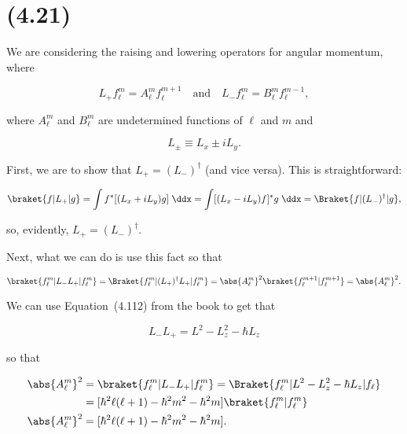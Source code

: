 \section{(4.21)}

We are considering the raising and lowering operators for angular momentum, where

\begin{equation}
    L_+ f_{\ell}^m = A_{\ell}^m f_{\ell}^{m+1} \quad\mathrm{and}\quad L_- f_{\ell}^m = B_{\ell}^m f_{\ell}^{m-1},
\end{equation}

where $A_{\ell}^m$ and $B_{\ell}^m$ are undetermined functions of $\ell$ and $m$ and 

\begin{equation}
    L_{\pm} \equiv L_x \pm iL_y.
\end{equation}

First, we are to show that $L_+ = (L_-)^{\dagger}$ (and vice versa). This is straightforward:

\begin{equation}
    \braket{f | L_+ | g} = \int f^* [(L_x + iL_y)g] \;\ddx = \int [(L_x - iL_y)f]^* g \;\ddx = \Braket{f | (L_-)^{\dagger} | g},
\end{equation}

so, evidently, $L_+ = (L_-)^{\dagger}$.

Next, what we can do is use this fact so that

\begin{equation}
    \braket{f_{\ell}^m | L_-L_+ | f_{\ell}^m} = \Braket{f_{\ell}^m | (L_+)^{\dagger}L_+ | f_{\ell}^m} = \abs{A_{\ell}^m}^2 \braket{f_{\ell}^{m+1} | f_{\ell}^{m+1}} = \abs{A_{\ell}^m}^2.
\end{equation}

We can use Equation~(4.112) from the book to get that

\begin{equation}
    L_-L_+ = L^2 - L_z^2 - \hbar L_z
\end{equation}

so that

\begin{align}
    \abs{A_{\ell}^m}^2 &= \braket{f_{\ell}^m | L_-L_+ | f_{\ell}^m} = \Braket{f_{\ell}^m | L^2 - L_z^2 - \hbar L_z | f_{\ell}} \\
    &= [\hbar^2 \ell(\ell+1) - \hbar^2m^2 - \hbar^2m] \braket{f_{\ell}^m | f_{\ell}^m} \\
    \abs{A_{\ell}^m}^2 &= [\hbar^2 \ell(\ell+1) - \hbar^2m^2 - \hbar^2m].\label{eq:1}
\end{align}

